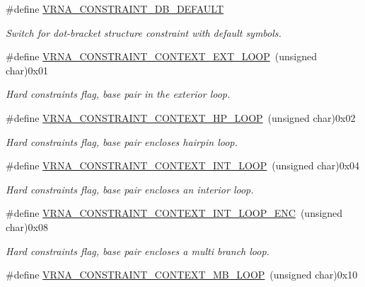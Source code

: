 \begin{DoxyCompactItemize}
\#define \mbox{\hyperlink{group__hard__constraints_ga1c3864bdc92147a4d93de2b1b4356177}{V\+R\+N\+A\+\_\+\+C\+O\+N\+S\+T\+R\+A\+I\+N\+T\+\_\+\+D\+B\+\_\+\+D\+E\+F\+A\+U\+LT}}
\begin{DoxyCompactList}\small\item\em Switch for dot-\/bracket structure constraint with default symbols. \end{DoxyCompactList}\item 
\#define \mbox{\hyperlink{group__hard__constraints_ga9418eda62a5dec070896702c279d2548}{V\+R\+N\+A\+\_\+\+C\+O\+N\+S\+T\+R\+A\+I\+N\+T\+\_\+\+C\+O\+N\+T\+E\+X\+T\+\_\+\+E\+X\+T\+\_\+\+L\+O\+OP}}~(unsigned char)0x01
\begin{DoxyCompactList}\small\item\em Hard constraints flag, base pair in the exterior loop. \end{DoxyCompactList}\item 
\#define \mbox{\hyperlink{group__hard__constraints_ga79203702b197b6b9d3b78eed40663eb1}{V\+R\+N\+A\+\_\+\+C\+O\+N\+S\+T\+R\+A\+I\+N\+T\+\_\+\+C\+O\+N\+T\+E\+X\+T\+\_\+\+H\+P\+\_\+\+L\+O\+OP}}~(unsigned char)0x02
\begin{DoxyCompactList}\small\item\em Hard constraints flag, base pair encloses hairpin loop. \end{DoxyCompactList}\item 
\#define \mbox{\hyperlink{group__hard__constraints_ga21feeab3a9e5fa5a9e3d9ac0fcf5994f}{V\+R\+N\+A\+\_\+\+C\+O\+N\+S\+T\+R\+A\+I\+N\+T\+\_\+\+C\+O\+N\+T\+E\+X\+T\+\_\+\+I\+N\+T\+\_\+\+L\+O\+OP}}~(unsigned char)0x04
\begin{DoxyCompactList}\small\item\em Hard constraints flag, base pair encloses an interior loop. \end{DoxyCompactList}\item 
\#define \mbox{\hyperlink{group__hard__constraints_ga0536288e04ff6332ecdc23ca4705402b}{V\+R\+N\+A\+\_\+\+C\+O\+N\+S\+T\+R\+A\+I\+N\+T\+\_\+\+C\+O\+N\+T\+E\+X\+T\+\_\+\+I\+N\+T\+\_\+\+L\+O\+O\+P\+\_\+\+E\+NC}}~(unsigned char)0x08
\begin{DoxyCompactList}\small\item\em Hard constraints flag, base pair encloses a multi branch loop. \end{DoxyCompactList}\item 
\#define \mbox{\hyperlink{group__hard__constraints_ga456ecd2ff00056bb64da8dd4f61bbfc5}{V\+R\+N\+A\+\_\+\+C\+O\+N\+S\+T\+R\+A\+I\+N\+T\+\_\+\+C\+O\+N\+T\+E\+X\+T\+\_\+\+M\+B\+\_\+\+L\+O\+OP}}~(unsigned char)0x10

\end{DoxyCompactItemize}
